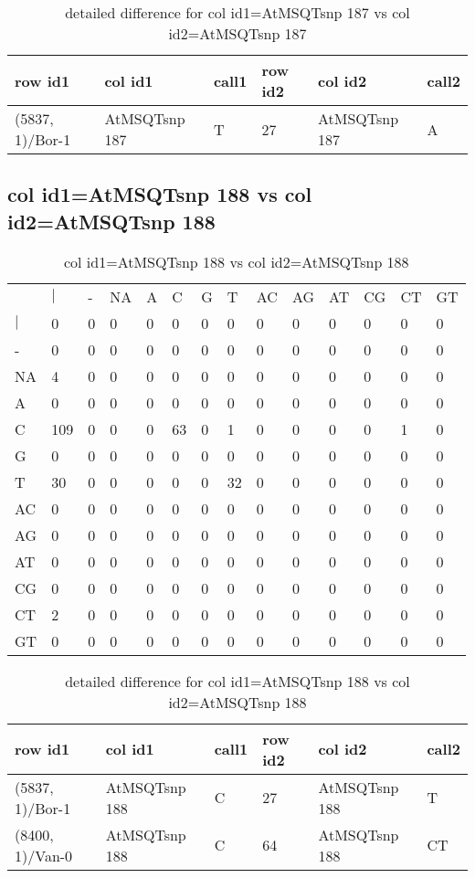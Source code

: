 \begin{center}
\begin{longtable}{|l|l|l|l|l|l|}
\caption{detailed difference for col id1=AtMSQTsnp 187 vs col id2=AtMSQTsnp 187} \label{table_dm557}\\
\hline
row id1&col id1&call1&row id2&col id2&call2\\
\hline
(5837, 1)/Bor-1&AtMSQTsnp 187&T&27&AtMSQTsnp 187&A\\
\hline
\end{longtable}
\end{center}

\subsection{col id1=AtMSQTsnp 188 vs col id2=AtMSQTsnp 188}
\begin{center}
\begin{longtable}{|l|l|l|l|l|l|l|l|l|l|l|l|l|l|}
\caption{col id1=AtMSQTsnp 188 vs col id2=AtMSQTsnp 188} \label{table_dm558}\\
\hline
\\
\hline
&$|$&-&NA&A&C&G&T&AC&AG&AT&CG&CT&GT\\
$|$&0&0&0&0&0&0&0&0&0&0&0&0&0\\
-&0&0&0&0&0&0&0&0&0&0&0&0&0\\
NA&4&0&0&0&0&0&0&0&0&0&0&0&0\\
A&0&0&0&0&0&0&0&0&0&0&0&0&0\\
C&109&0&0&0&63&0&1&0&0&0&0&1&0\\
G&0&0&0&0&0&0&0&0&0&0&0&0&0\\
T&30&0&0&0&0&0&32&0&0&0&0&0&0\\
AC&0&0&0&0&0&0&0&0&0&0&0&0&0\\
AG&0&0&0&0&0&0&0&0&0&0&0&0&0\\
AT&0&0&0&0&0&0&0&0&0&0&0&0&0\\
CG&0&0&0&0&0&0&0&0&0&0&0&0&0\\
CT&2&0&0&0&0&0&0&0&0&0&0&0&0\\
GT&0&0&0&0&0&0&0&0&0&0&0&0&0\\
\hline
\end{longtable}
\end{center}

\begin{center}
\begin{longtable}{|l|l|l|l|l|l|}
\caption{detailed difference for col id1=AtMSQTsnp 188 vs col id2=AtMSQTsnp 188} \label{table_dm559}\\
\hline
row id1&col id1&call1&row id2&col id2&call2\\
\hline
(5837, 1)/Bor-1&AtMSQTsnp 188&C&27&AtMSQTsnp 188&T\\
(8400, 1)/Van-0&AtMSQTsnp 188&C&64&AtMSQTsnp 188&CT\\
\hline
\end{longtable}
\end{center}


